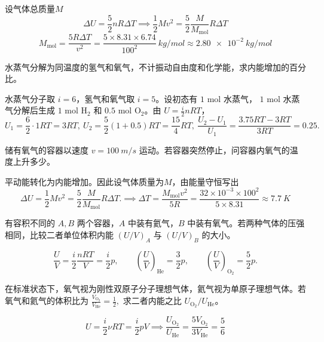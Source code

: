 \documentclass[lang=cn,11pt]{elegantbook}
\begin{document}
\begin{solution}
设气体总质量$M$\[\Delta U=\frac52 nR\Delta T\implies\frac12 Mv^2=\frac52\frac{M}{M_{\mathrm{mol}}}R\Delta T\]
 \[M_{\mathrm{mol}} =\frac{5R\Delta T}{v^2} =\frac{5\times 8.31\times 6.74}{100^2}\ \si{kg/mol} \approx \SI{2.80e-2}{kg/mol}\]
\end{solution}

\begin{exercise}[水蒸气分解为同温氢气和氧气时内能增加多少]
水蒸气分解为同温度的氢气和氧气，不计振动自由度和化学能，求内能增加的百分比。
\end{exercise}

\begin{solution}
水蒸气分子取 \(i=6\)，氢气和氧气取 \(i=5\)。设初态有 \(1\) mol 水蒸气， \(1\) mol 水蒸气分解后生成 \(1\) mol \(\mathrm{H_2}\) 和 \(0.5\) mol \(\mathrm{O_2}\)。由 \(U=\frac{i}{2}nRT\)，
 \[U_1=\frac{6}{2}\cdot1RT=3RT,~ U_2=\frac{5}{2}(1+0.5)RT=\frac{15}{4}RT,~\frac{U_2-U_1}{U_1} =\frac{3.75RT-3RT}{3RT} =0.25.\] 
\end{solution}

\begin{exercise}[容器骤停后温升为什么先看整体平动动能去哪了]
储有氧气的容器以速度 \(v=\SI{100}{m/s}\) 运动。若容器突然停止，问容器内氧气的温度上升多少。
\end{exercise}

\begin{solution}
平动能转化为内能增加。因此设气体质量为$M$，由能量守恒写出
 \[\Delta U=\frac12 Mv^2=\frac52 \frac{M}{M_{\mathrm{mol}}}R\Delta T. \implies \Delta T=\frac{M_{\mathrm{mol}}v^2}{5R}=\frac{32\times10^{-3}\times 100^2}{5\times 8.31}\approx \SI{7.7}{K}\]
\end{solution}


\begin{exercise}
有容积不同的 \(A,B\) 两个容器，\(A\) 中装有氦气，\(B\) 中装有氧气。若两种气体的压强相同，比较二者单位体积内能 \((U/V)_A\) 与 \((U/V)_B\) 的大小。
\end{exercise}

\begin{solution}
 \[\frac{U}{V}=\frac{i}{2}\frac{nRT}{V}=\frac{i}{2}p,\qquad \left(\frac{U}{V}\right)_{\mathrm{He}}=\frac32p,\qquad \left(\frac{U}{V}\right)_{\mathrm{O_2}}=\frac52p.\]
\end{solution}

\begin{exercise}
在标准状态下，氧气视为刚性双原子分子理想气体，氦气视为单原子理想气体。若氧气和氦气的体积比为
 \(\frac{V_{\mathrm{O_2}}}{V_{\mathrm{He}}}=\frac12,\) 
求二者内能之比 \(U_{\mathrm{O_2}}/U_{\mathrm{He}}\)。
\end{exercise}
\begin{solution}
 \[U=\frac{i}{2}\nu RT=\frac{i}{2}pV \implies \frac{U_{\mathrm{O_2}}}{U_{\mathrm{He}}}=\frac{5V_{\mathrm{O_2}}}{3V_{\mathrm{He}}} =\frac56\]
\end{solution}
\end{document}
